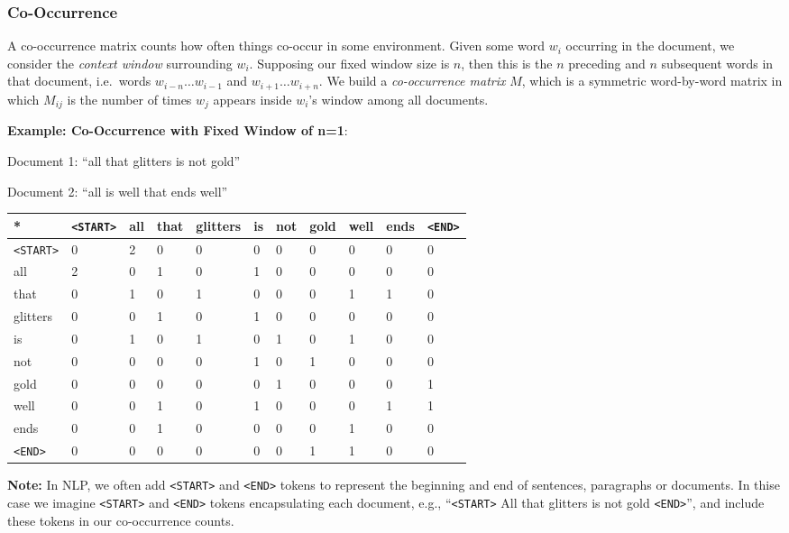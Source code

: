 \documentclass[11pt]{article}
\begin{document}
    \hypertarget{co-occurrence}{%
\subsubsection{Co-Occurrence}\label{co-occurrence}}

A co-occurrence matrix counts how often things co-occur in some
environment. Given some word \(w_i\) occurring in the document, we
consider the \emph{context window} surrounding \(w_i\). Supposing our
fixed window size is \(n\), then this is the \(n\) preceding and \(n\)
subsequent words in that document, i.e.~words \(w_{i-n} \dots w_{i-1}\)
and \(w_{i+1} \dots w_{i+n}\). We build a \emph{co-occurrence matrix}
\(M\), which is a symmetric word-by-word matrix in which \(M_{ij}\) is
the number of times \(w_j\) appears inside \(w_i\)'s window among all
documents.

\textbf{Example: Co-Occurrence with Fixed Window of n=1}:

Document 1: ``all that glitters is not gold''

Document 2: ``all is well that ends well''

\begin{longtable}[]{@{}lllllllllll@{}}
\toprule
* & \texttt{\textless{}START\textgreater{}} & all & that & glitters & is
& not & gold & well & ends &
\texttt{\textless{}END\textgreater{}}\tabularnewline
\midrule
\endhead
\texttt{\textless{}START\textgreater{}} & 0 & 2 & 0 & 0 & 0 & 0 & 0 & 0
& 0 & 0\tabularnewline
all & 2 & 0 & 1 & 0 & 1 & 0 & 0 & 0 & 0 & 0\tabularnewline
that & 0 & 1 & 0 & 1 & 0 & 0 & 0 & 1 & 1 & 0\tabularnewline
glitters & 0 & 0 & 1 & 0 & 1 & 0 & 0 & 0 & 0 & 0\tabularnewline
is & 0 & 1 & 0 & 1 & 0 & 1 & 0 & 1 & 0 & 0\tabularnewline
not & 0 & 0 & 0 & 0 & 1 & 0 & 1 & 0 & 0 & 0\tabularnewline
gold & 0 & 0 & 0 & 0 & 0 & 1 & 0 & 0 & 0 & 1\tabularnewline
well & 0 & 0 & 1 & 0 & 1 & 0 & 0 & 0 & 1 & 1\tabularnewline
ends & 0 & 0 & 1 & 0 & 0 & 0 & 0 & 1 & 0 & 0\tabularnewline
\texttt{\textless{}END\textgreater{}} & 0 & 0 & 0 & 0 & 0 & 0 & 1 & 1 &
0 & 0\tabularnewline
\bottomrule
\end{longtable}

\textbf{Note:} In NLP, we often add
\texttt{\textless{}START\textgreater{}} and
\texttt{\textless{}END\textgreater{}} tokens to represent the beginning
and end of sentences, paragraphs or documents. In thise case we imagine
\texttt{\textless{}START\textgreater{}} and
\texttt{\textless{}END\textgreater{}} tokens encapsulating each
document, e.g., ``\texttt{\textless{}START\textgreater{}} All that
glitters is not gold \texttt{\textless{}END\textgreater{}}'', and
include these tokens in our co-occurrence counts.
\end{document}
